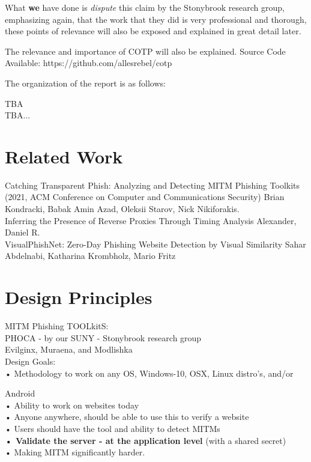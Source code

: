 \documentclass[a4paper, 11pt]{ article}
\begin{document}
What \textbf{we} have done is \textit{dispute} this claim by the Stonybrook research group, emphasizing again, that the work that they did is very professional and thorough, these points of relevance will also be exposed and explained in great detail later. 

\noindent
The relevance and importance of COTP will also be explained.
Source Code Available: https://github.com/allesrebel/cotp

The organization of the report is as follows:

\noindent
TBA\\
TBA...

\section{Related Work}
Catching Transparent Phish: Analyzing and Detecting MITM Phishing Toolkits (2021, ACM Conference on Computer and Communications Security)
Brian Kondracki, Babak Amin Azad, Oleksii Starov, Nick Nikiforakis.\\

\noindent
Inferring the Presence of Reverse Proxies Through Timing Analysis
Alexander, Daniel R.\\

\noindent
VisualPhishNet: Zero-Day Phishing Website Detection by Visual Similarity
Sahar Abdelnabi, Katharina Krombholz, Mario Fritz\\

\section{Design Principles}
MITM Phishing TOOLkitS:\\
PHOCA - by our SUNY - Stonybrook research group\\
Evilginx, Muraena, and Modlishka \\


\noindent	%
Design Goals:\\
• Methodology to work on any OS, Windows-10, OSX, Linux distro's,  and/or 

Android\\
• Ability to work on websites today\\
• Anyone anywhere, should be able to use this to verify a website\\
• Users should have the tool and ability to detect MITMs\\
\textbf{• Validate the server - at the application level} (with a shared secret)\\
• Making MITM significantly harder.\\
\end{document}

